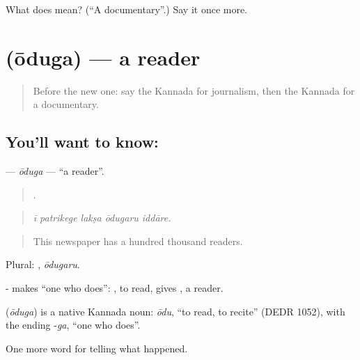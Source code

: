 \begin{tcolorbox}[breakable,colback=teal!4,colframe=teal!35!black,title={Before you move on}]
What does  mean? (\textquotedblleft{}A documentary\textquotedblright{}.) Say it once more.
\end{tcolorbox}
\section[\texorpdfstring{\kn{ಓದುಗ} (ōduga)}{ಓದುಗ (ōduga)}]{ (ōduga) — a reader}

\label{lesson:KA-C370-oduga}



\begin{quote}
Before the new one: say the Kannada for journalism, then the Kannada for a documentary.
\end{quote}

\subsection*{You'll want to know: }
\textbf{} — \emph{ōduga} — \textquotedblleft{}a reader\textquotedblright{}.

\begin{quote}
    .
\end{quote}

\begin{quote}
\emph{ī patrikege lakṣa ōdugaru iddāre.}
\end{quote}

\begin{quote}
This newspaper has a hundred thousand readers.
\end{quote}

Plural: , \emph{ōdugaru}.

- makes \textquotedblleft{}one who does\textquotedblright{}: , to read, gives , a reader.

\begin{cousinweb}
\textbf{} (\emph{ōduga}) is a native Kannada noun: \emph{ōdu}, \textquotedblleft{}to read, to recite\textquotedblright{} (DEDR 1052), with the ending -\emph{ga}, \textquotedblleft{}one who does\textquotedblright{}.
\end{cousinweb}

\begin{grammarlens}[title={What you've built}]
One more word for telling what happened.
\end{grammarlens}

